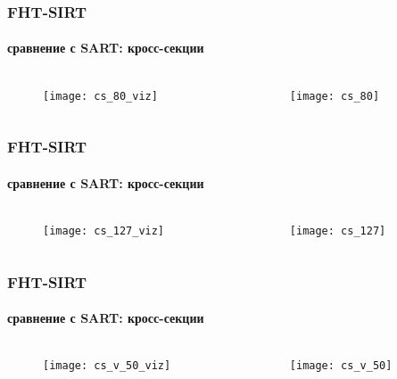 \begin{frame}
\frametitle{FHT-SIRT}
\framesubtitle{сравнение с SART: кросс-секции}
\begin{columns}[T,onlytextwidth]
  \hspace*{-1cm}
  \begin{column}{0.4\textwidth}
    \begin{figure}
      \centering
      \texttt{[image: cs\_80\_viz]}
    \end{figure}
  \end{column}
  \begin{column}{0.6\textwidth}
    \begin{figure}
      \centering
      \texttt{[image: cs\_80]}
    \end{figure}
  \end{column}
\end{columns}
\end{frame}

\begin{frame}
\frametitle{FHT-SIRT}
\framesubtitle{сравнение с SART: кросс-секции}
\begin{columns}[T,onlytextwidth]
  \hspace*{-1cm}
  \begin{column}{0.4\textwidth}
    \begin{figure}
      \centering
      \texttt{[image: cs\_127\_viz]}
    \end{figure}
  \end{column}
  \begin{column}{0.6\textwidth}
    \begin{figure}
      \centering
      \texttt{[image: cs\_127]}
    \end{figure}
  \end{column}
\end{columns}
\end{frame}


\begin{frame}
\frametitle{FHT-SIRT}
\framesubtitle{сравнение с SART: кросс-секции}
\begin{columns}[T,onlytextwidth]
  \hspace*{-1cm}
  \begin{column}{0.4\textwidth}
    \begin{figure}
      \centering
      \texttt{[image: cs\_v\_50\_viz]}
    \end{figure}
  \end{column}
  \begin{column}{0.6\textwidth}
    \begin{figure}
      \centering
      \texttt{[image: cs\_v\_50]}
    \end{figure}
  \end{column}
\end{columns}
\end{frame}


